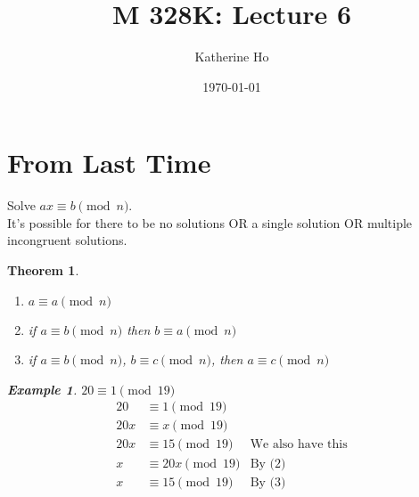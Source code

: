 \documentclass[letterpaper]{article}
\title{M 328K: Lecture 6}
\author{Katherine Ho}
\date\today
\newtheorem{theorem}{Theorem}[section]
\newtheorem{example}{Example}[theorem]
\begin{document}
\maketitle

\section{From Last Time}
    Solve $ax \equiv b \pmod{n}$. \\
    It's possible for there to be no solutions OR a single solution OR 
    multiple incongruent solutions.
    \begin{theorem}
        \begin{enumerate}
            \item $a\equiv a \pmod{n}$
            \item if $a\equiv b \pmod{n}$ then $b\equiv a \pmod{n}$
            \item if $a\equiv b \pmod{n}$, $b\equiv c \pmod{n}$, then
            $a\equiv c \pmod{n}$
        \end{enumerate}
        \begin{example} $20 \equiv 1 \pmod{19}$
            \begin{align*}
                20 & \equiv 1 \pmod{19} \\
                20x & \equiv x \pmod{19} \\
                20x & \equiv 15 \pmod{19} & \text{We also have this}\\
                x & \equiv 20x \pmod{19} & \text{By (2)} \\
                x & \equiv 15 \pmod{19} & \text{By (3)}
            \end{align*}
        \end{example}
    \end{theorem}
\end{document}

